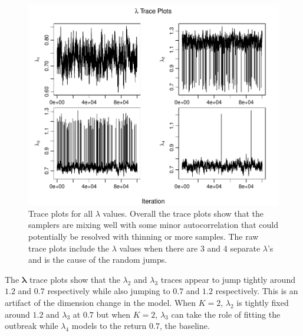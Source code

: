 \documentclass[11pt,a4paper]{article}
\numberwithin{equation}{section}
\begin{document}
\begin{figure}

{\centering \includegraphics[height=0.41\textheight]{thesis_draft_files/figure-latex/unnamed-chunk-5-1} 

}

\caption{Trace plots for all $\lambda$ values. Overall the trace plots show that the samplers are mixing well with some minor autocorrelation that could potentially be resolved with thinning or more samples. The raw trace plots include the $\lambda$ values when there are 3 and 4 separate $\lambda$'s and is the cause of the random jumps.}\label{fig:unnamed-chunk-5}
\end{figure}

The \(\boldsymbol{\lambda}\) trace plots show that the \(\lambda_2\) and
\(\lambda_3\) traces appear to jump tightly around \(1.2\) and \(0.7\)
respectively while also jumping to \(0.7\) and \(1.2\) respectively.
This is an artifact of the dimension change in the model. When
\(K = 2\), \(\lambda_2\) is tightly fixed around \(1.2\) and
\(\lambda_3\) at \(0.7\) but when \(K = 2\), \(\lambda_3\) can take the
role of fitting the outbreak while \(\lambda_4\) models to the return
\(0.7\), the baseline.
\end{document}
